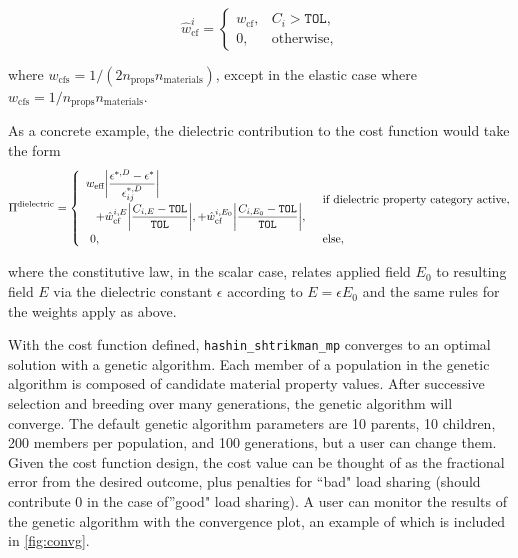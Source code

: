 \[\hat{w}_{\text{cf}}^{i} = 
\begin{cases}
w_{\text{cf}}, & C_{i} >  \texttt{TOL}, \\
0, & \text{otherwise},
\end{cases}\]

where \(w_{\text{cfs}} = 1/(2n_{\text{props}}n_{\text{materials}})\),
except in the elastic case where
\(w_{\text{cfs}} = 1/n_{\text{props}}n_{\text{materials}}\).

As a concrete example, the dielectric contribution to the cost function
would take the form \begin{equation}\label{eqn:pi-elastic}
\Pi^{\text{dielectric}} =
\begin{cases}
\begin{array}{l}
w_{\text{eff}} \biggl\vert\displaystyle\frac{\epsilon^{*,D} - \epsilon^{*}}{\epsilon_{ij}^{*,D}}\biggr\vert \\[10pt]
\hspace{3mm} + \hat{w}_{\text{cf}}^{i, E} \biggl\vert\displaystyle\frac{C_{i,E}-\texttt{TOL}}{\texttt{TOL}}\biggr\vert, 
+ \hat{w}_{\text{cf}}^{i, E_{0}} \biggl\vert\displaystyle\frac{C_{i,E_{0}}-\texttt{TOL}}{\texttt{TOL}}\biggr\vert,
\end{array} & \text{if dielectric property category active}, \\
\hspace{3mm} 0, & \text{else},
\end{cases}
\end{equation}

where the constitutive law, in the scalar case, relates applied field
\(E_{0}\) to resulting field \(E\) via the dielectric constant
\(\epsilon\) according to \(E = \epsilon E_{0}\) and the same rules for
the weights apply as above.

With the cost function defined, \texttt{hashin\_shtrikman\_mp} converges
to an optimal solution with a genetic algorithm. Each member of a
population in the genetic algorithm is composed of candidate material
property values. After successive selection and breeding over many
generations, the genetic algorithm will converge. The default genetic
algorithm parameters are 10 parents, 10 children, 200 members per
population, and 100 generations, but a user can change them. Given the
cost function design, the cost value can be thought of as the fractional
error from the desired outcome, plus penalties for ``bad" load sharing
(should contribute 0 in the case of''good" load sharing). A user can
monitor the results of the genetic algorithm with the convergence plot,
an example of which is included in \autoref{fig:convg}.

